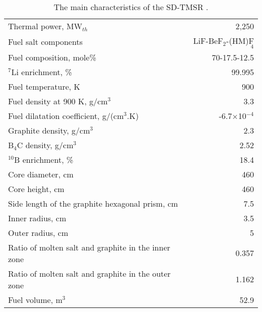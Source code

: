 \begin{table}  %
	\caption{The main characteristics of the SD-TMSR \cite{li_optimization_2018}.}
	\vspace{0.1in}
	\begin{tabularx}{\textwidth}{l | r}
		\hline
		Thermal power, MW$_{th}$          				&  2,250  \\ 
		Fuel salt components                            & LiF-BeF$_2$-(\gls{HM})F$_4$ \\
		Fuel composition, mole\%                        & 70-17.5-12.5    \\
		$^7$Li enrichment, \%        				& 99.995   \\
		Fuel temperature, K 							& 900  \\
		Fuel density at 900 K, g/cm$^3$		  		& 3.3 \\
		Fuel dilatation coefficient, g/(cm$^3$$.$K)  &  -6.7$\times$10$^{-4}$ \\
		Graphite density, g/cm$^3$             	    & 2.3	\\  
		B$_4$C density, g/cm$^3$					& 2.52  \\
		$^{10}$B enrichment, \%						&  18.4  \\
		Core diameter, cm								& 460  \\
		Core height, cm									& 460  \\
		Side length of the graphite hexagonal prism, cm   & 7.5 \\
		Inner radius, cm							& 3.5  \\
		Outer radius, cm							& 5  \\
		Ratio of molten salt and graphite in the inner zone	&  0.357  \\
		Ratio of molten salt and graphite in the outer zone &  1.162  \\
		Fuel volume, m$^3$  &	52.9 \\
		\hline
	\end{tabularx}
	\label{tab:table1}
\end{table}


